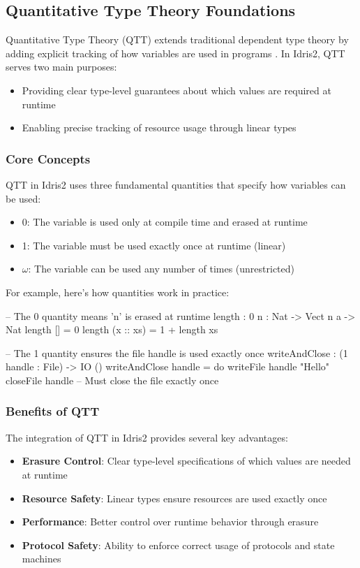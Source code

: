 \documentclass[]{rptuseminar}
\begin{document}
\subsection{Quantitative Type Theory Foundations}  
\label{subsec:qtt-foundations}  
Quantitative Type Theory (QTT) extends traditional dependent type theory by adding explicit tracking of how variables are used in programs \cite{atkey2018syntax}. In Idris2, QTT serves two main purposes:  
\begin{itemize}  
    \item Providing clear type-level guarantees about which values are required at runtime  
    \item Enabling precise tracking of resource usage through linear types  
\end{itemize}  

\subsubsection{Core Concepts}  
QTT in Idris2 uses three fundamental quantities that specify how variables can be used:  
\begin{itemize}  
    \item 0: The variable is used only at compile time and erased at runtime  
    \item 1: The variable must be used exactly once at runtime (linear)  
    \item $\omega$: The variable can be used any number of times (unrestricted)  
\end{itemize}  

For example, here's how quantities work in practice:  
\begin{idris}  
-- The 0 quantity means 'n' is erased at runtime  
length : {0 n : Nat} -> Vect n a -> Nat  
length [] = 0  
length (x :: xs) = 1 + length xs  

-- The 1 quantity ensures the file handle is used exactly once  
writeAndClose : (1 handle : File) -> IO ()  
writeAndClose handle = do  
    writeFile handle "Hello"  
    closeFile handle  -- Must close the file exactly once  
\end{idris}  

\subsubsection{Benefits of QTT}  
The integration of QTT in Idris2 provides several key advantages:  
\begin{itemize}  
    \item \textbf{Erasure Control}: Clear type-level specifications of which values are needed at runtime  
    \item \textbf{Resource Safety}: Linear types ensure resources are used exactly once  
    \item \textbf{Performance}: Better control over runtime behavior through erasure  
    \item \textbf{Protocol Safety}: Ability to enforce correct usage of protocols and state machines  
\end{itemize}  
\end{document}
